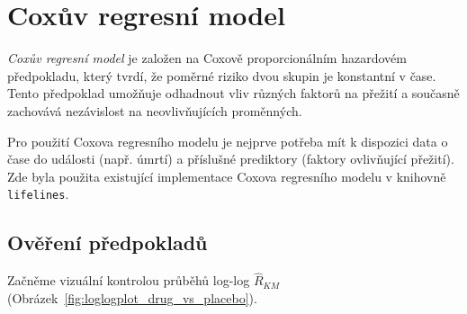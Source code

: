 \documentclass[a4, 11pt]{article}
\theoremstyle{definition}
\theoremstyle{remark}
\begin{document}
    
    
	\section{Coxův regresní model} \label{sec:cox_model}
	\textit{Coxův regresní model} je založen na Coxově proporcionálním hazardovém předpokladu, který tvrdí, že poměrné riziko dvou skupin je konstantní v čase. Tento předpoklad umožňuje odhadnout vliv různých faktorů na přežití a současně zachovává nezávislost na neovlivňujících proměnných.
	
	Pro použití Coxova regresního modelu je nejprve potřeba mít k dispozici data o čase do události (např. úmrtí) a příslušné prediktory (faktory ovlivňující přežití). Zde byla použita existující implementace Coxova regresního modelu v knihovně \texttt{lifelines}.
	
	\subsection{Ověření předpokladů}
	Začněme vizuální kontrolou průběhů log-log $ \hat{R}_{KM} $ (Obrázek~\ref{fig:loglogplot_drug_vs_placebo}).
	 
\end{document}
